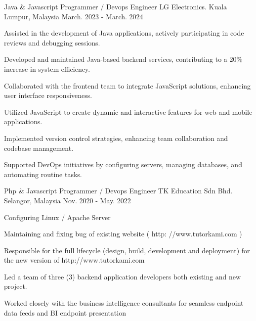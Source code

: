 \begin{cventries}
  \cventry
    {Java \& Javascript Programmer / Devops Engineer} %
    {LG Electronics.} %
    {Kuala Lumpur, Malaysia} %
    {March. 2023 - March. 2024} %
    {
      \begin{cvitems} %
      \item Assisted in the development of Java applications, actively participating in code reviews and debugging sessions.
      \item Developed and maintained Java-based backend services, contributing to a 20\% increase in system efficiency.
      \item Collaborated with the frontend team to integrate JavaScript solutions, enhancing user interface responsiveness.
      \item Utilized JavaScript to create dynamic and interactive features for web and mobile applications.
      \item Implemented version control strategies, enhancing team collaboration and codebase management.
      \item Supported DevOps initiatives by configuring servers, managing databases, and automating routine tasks.
      \end{cvitems}
    }

  \cventry
    {Php \& Javascript Programmer / Devops Engineer} %
    {TK Education Sdn Bhd.} %
    {Selangor, Malaysia} %
    {Nov. 2020 - May. 2022} %
    {
      \begin{cvitems} %
      	\item Configuring Linux / Apache Server
      	\item Maintaining and fixing bug of existing website ( http: //www.tutorkami.com )
      	\item Responsible for the full lifecycle (design, build, development and deployment) for the new version of http://www.tutorkami.com
      	\item Led a team of three (3) backend application developers both existing and new project.
      	\item Worked closely with the business intelligence consultants for seamless endpoint data feeds and BI endpoint presentation
      \end{cvitems}
    }


\end{cventries}
